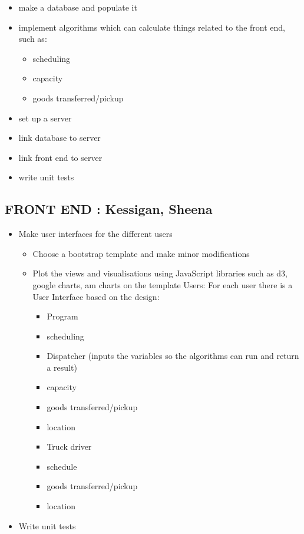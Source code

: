 \documentclass[paper=a4, fontsize=11pt]{scrartcl} %
\numberwithin{equation}{section} %
\numberwithin{figure}{section} %
\numberwithin{table}{section} %
\begin{document}
\begin{itemize}
	\item  make a database and populate it
	\item  implement algorithms which can calculate things related to the front end, such as:
		\begin{itemize}
		 \item scheduling
		\item capacity
		\item goods transferred/pickup 
		\end{itemize}
	\item set up a server
	\item link database to server
	\item	link front end to server
	\item	write unit tests  
\end{itemize}




\subsection{	FRONT END : Kessigan, Sheena}

\begin{itemize}
	\item  Make user interfaces for the different users

		\begin{itemize}
		 \item Choose a bootstrap template and make minor modifications
		\item Plot the views and visualisations using JavaScript libraries such as d3, google charts, am charts on the template Users: For each user there is a User Interface based on the design:
		
		\begin{itemize}
		\item Program
		\item scheduling
		\item Dispatcher (inputs the variables so the algorithms can run and return a result)
		\item capacity
					\item goods transferred/pickup
					\item location
				\item Truck driver
					\item schedule
					\item goods transferred/pickup
					\item location
		\end{itemize}
		
		\end{itemize}
	\item Write unit tests 
\end{itemize}
\end{document}
